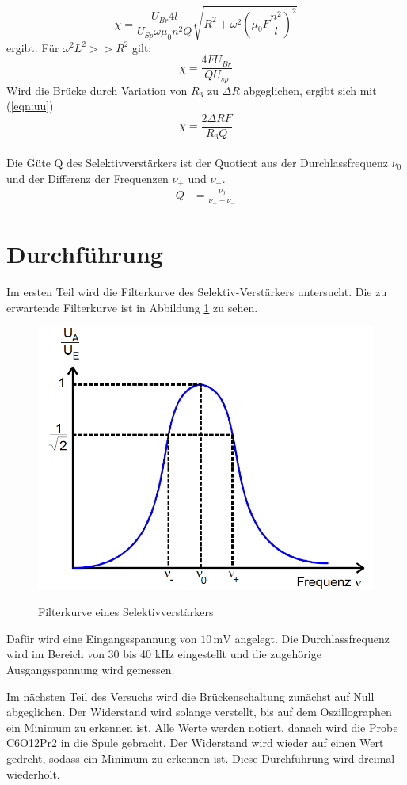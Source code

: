 \begin{equation}
  \chi = \frac{U_{Br}4l}{U_{Sp}\omega \mu_0 n^2 Q}\sqrt{R^2 +\omega^2\left(\mu_0F \frac{n^2}{l}\right)^2}
\end{equation}
ergibt.
Für $\omega^2L^2>>R^2$ gilt:
\begin{equation}
  \chi = \frac{4FU_{Br}}{QU_{sp}}
  \label{eqn:xs}
\end{equation}
Wird die Brücke durch Variation von $R_3$ zu $\Delta R$ abgeglichen, ergibt sich mit (\ref{eqn:uu})
\begin{equation}
  \chi =\frac{2\Delta R F}{R_3 Q}
  \label{eqn:xw}
\end{equation}
\\
Die Güte Q des Selektivverstärkers ist der Quotient aus der Durchlassfrequenz $\nu_0$ und
der Differenz der Frequenzen $\nu_+$ und $\nu_-$.
\begin{align}
  Q &= \frac{\nu_0}{\nu_+ - \nu_-}
\end{align}


  \section{Durchführung}
Im ersten Teil wird die Filterkurve des Selektiv-Verstärkers untersucht.
Die zu erwartende Filterkurve ist in Abbildung \ref{fig:fil} zu sehen.
\begin{figure}
  \centering
  \includegraphics[scale=0.4]{4.png}
  \caption{Filterkurve eines Selektivverstärkers}\cite{Anleitung}
  \label{fig:fil}
\end{figure}
Dafür wird eine Eingangsspannung von $10\,\mathrm{mV}$ angelegt.
Die Durchlassfrequenz wird im Bereich von 30 bis 40 kHz eingestellt und
die zugehörige Ausgangsspannung wird gemessen.

Im nächsten Teil des Versuchs wird die Brückenschaltung zunächst auf Null abgeglichen.
Der Widerstand wird solange verstellt, bis auf dem Oszillographen ein Minimum zu erkennen ist.
Alle Werte werden notiert,
danach wird die Probe C6O12Pr2 in die Spule gebracht.
Der Widerstand wird wieder auf einen Wert gedreht,
sodass ein Minimum zu erkennen ist.
Diese Durchführung wird dreimal wiederholt.
